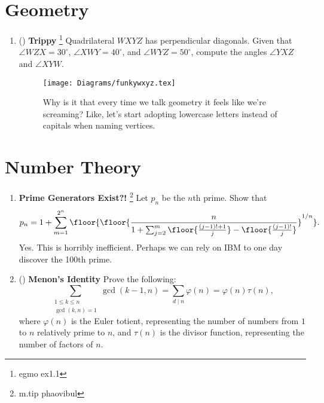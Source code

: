\documentclass[11pt]{scrartcl}
\begin{document}
\newpage
\section{Geometry}
\begin{enumerate}[label=\textbf{G\arabic*}.]
    \item (\halfchili) \textbf{Trippy} \footnote{egmo ex1.1} \newline
    Quadrilateral $WXYZ$ has perpendicular diagonals. Given that $\angle WZX = 30^\circ$, $\angle XWY = 40^\circ$, and $\angle WYZ = 50^\circ$, compute the angles $\angle YXZ$ and $\angle XYW$.
    \begin{figure}[h]
        \centering
        \texttt{[image: Diagrams/funkywxyz.tex]} %
        \caption{Why is it that every time we talk geometry it feels like we're screaming? Like, let's start adopting lowercase letters instead of capitals when naming vertices.}
        \label{fig:funkywxyz}
    \end{figure}
\end{enumerate}

\newpage
\section{Number Theory}
\begin{enumerate}[label=\textbf{N\arabic*}.]
    \item \textbf{Prime Generators Exist?!} \footnote{m.tip phaovibul} \newline
    Let $p_n$ be the $n$th prime. Show that
    \[ p_n = 1 + \sum_{m=1}^{2^n}{\floor{\floor{\frac{n}{1 + \sum^{m}_{j=2}{\floor{\frac{(j-1)! + 1}{j}} - \floor{\frac{(j-1)!}{j}}}}}^{1/n}}}. \]
    Yes. This is horribly inefficient. Perhaps we can rely on IBM to one day discover the 100th prime.

    \item (\halfchili) \textbf{Menon's Identity} \newline
    Prove the following:
    \[ \sum_{\substack{1 \leq k \leq n \\ \gcd(k, n) = 1}} \gcd(k-1, n) = \sum_{d \mid n} \varphi(n) = \varphi(n) \tau(n), \]
    where $\varphi(n)$ is the Euler totient, representing the number of numbers from $1$ to $n$ relatively prime to $n$, and $\tau(n)$ is the divisor function, representing the number of factors of $n$. 
\end{enumerate}
\end{document}
